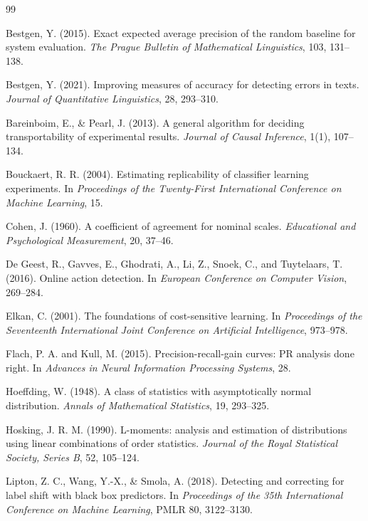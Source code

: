 \documentclass[11pt]{article}
\theoremstyle{remark}
\begin{document}
\begin{thebibliography}{99}

Bestgen, Y. (2015).
Exact expected average precision of the random baseline for system evaluation.
\emph{The Prague Bulletin of Mathematical Linguistics}, 103, 131--138.

Bestgen, Y. (2021).
Improving measures of accuracy for detecting errors in texts.
\emph{Journal of Quantitative Linguistics}, 28, 293--310.

Bareinboim, E., \& Pearl, J. (2013).
A general algorithm for deciding transportability of experimental results.
\emph{Journal of Causal Inference}, 1(1), 107--134.

Bouckaert, R. R. (2004).
Estimating replicability of classifier learning experiments.
In \emph{Proceedings of the Twenty-First International Conference on Machine Learning}, 15.

Cohen, J. (1960).
A coefficient of agreement for nominal scales.
\emph{Educational and Psychological Measurement}, 20, 37--46.

De Geest, R., Gavves, E., Ghodrati, A., Li, Z., Snoek, C., and Tuytelaars, T. (2016).
Online action detection.
In \emph{European Conference on Computer Vision}, 269--284.

Elkan, C. (2001).
The foundations of cost-sensitive learning.
In \emph{Proceedings of the Seventeenth International Joint Conference on Artificial Intelligence}, 973--978.

Flach, P. A. and Kull, M. (2015).
Precision-recall-gain curves: PR analysis done right.
In \emph{Advances in Neural Information Processing Systems}, 28.

Hoeffding, W. (1948).
A class of statistics with asymptotically normal distribution.
\emph{Annals of Mathematical Statistics}, 19, 293--325.

Hosking, J. R. M. (1990).
L-moments: analysis and estimation of distributions using linear combinations of order statistics.
\emph{Journal of the Royal Statistical Society, Series B}, 52, 105--124.

Lipton, Z. C., Wang, Y.-X., \& Smola, A. (2018).
Detecting and correcting for label shift with black box predictors.
In \emph{Proceedings of the 35th International Conference on Machine Learning}, PMLR 80, 3122--3130.


\end{thebibliography}
\end{document}
